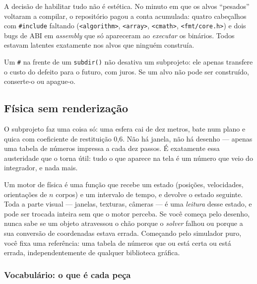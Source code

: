 \begin{porque}
A decisão de habilitar tudo não é estética. No minuto em que os alvos
``pesados'' voltaram a compilar, o repositório pagou a conta acumulada: quatro
cabeçalhos com \texttt{\#include} faltando (\texttt{<algorithm>},
\texttt{<array>}, \texttt{<cmath>}, \texttt{<fmt/core.h>}) e dois bugs de ABI em
\emph{assembly} que só apareceram ao \emph{executar} os binários. Todos estavam
latentes exatamente nos alvos que ninguém construía.

Um \texttt{\#} na frente de um \texttt{subdir()} não desativa um subprojeto: ele
apenas transfere o custo do defeito para o futuro, com juros. Se um alvo não
pode ser construído, conserte-o ou apague-o.
\end{porque}

\subsection{Física sem renderização}
\label{sec:collision}

O subprojeto  faz uma coisa só: uma esfera cai de dez metros,
bate num plano e quica com coeficiente de restituição 0,6. Não há janela, não há
desenho --- apenas uma tabela de números impressa a cada dez passos. É
exatamente essa austeridade que o torna útil: tudo o que aparece na tela é um
número que veio do integrador, e nada mais.

\begin{porque}
Um motor de física é uma função que recebe um estado (posições, velocidades,
orientações de $n$ corpos) e um intervalo de tempo, e devolve o estado seguinte.
Toda a parte visual --- janelas, texturas, câmeras --- é uma \emph{leitura} desse
estado, e pode ser trocada inteira sem que o motor perceba. Se você começa pelo
desenho, nunca sabe se um objeto atravessou o chão porque o \emph{solver} falhou
ou porque a sua conversão de coordenadas estava errada. Começando pelo simulador
puro, você fixa uma referência: uma tabela de números que ou está certa ou está
errada, independentemente de qualquer biblioteca gráfica.
\end{porque}

\subsubsection{Vocabulário: o que é cada peça}

